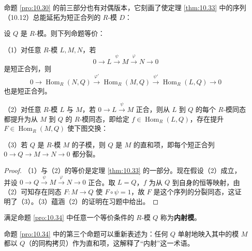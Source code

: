 命题 \ref{pro:10.30} 的前三部分也有对偶版本，它刻画了使定理 \ref{thm:10.33} 中的序列（10.12）总能延拓为短正合列的 \(R\)-模 \(D\)：

\begin{proposition}\label{pro:10.34}
设 \(Q\) 是 \(R\)-模。则下列命题等价：

（1）对任意 \(R\)-模 \(L, M, N\)，若
\[
0 \longrightarrow L \xrightarrow{\ \psi\ } M \xrightarrow{\ \varphi\ } N \longrightarrow 0
\]
是短正合列，则
\[
0 \longrightarrow \operatorname{Hom}_R(N, Q) \xrightarrow{\ \varphi'\ } \operatorname{Hom}_R(M, Q) \xrightarrow{\ \psi'\ } \operatorname{Hom}_R(L, Q) \longrightarrow 0
\]
也是短正合列。

（2）对任意 \(R\)-模 \(L\) 与 \(M\)，若 \(0 \to L \xrightarrow{\psi} M\) 正合，则从 \(L\) 到 \(Q\) 的每个 \(R\)-模同态都提升为从 \(M\) 到 \(Q\) 的 \(R\)-模同态，即给定 \(f \in \operatorname{Hom}_R(L, Q)\)，存在提升 \(F \in \operatorname{Hom}_R(M, Q)\) 使下图交换：
\begin{center}\end{center}

（3）若 \(Q\) 是 \(R\)-模 \(M\) 的子模，则 \(Q\) 是 \(M\) 的直和项，即每个短正合列 \(0 \to Q \to M \to N \to 0\) 都分裂。
\end{proposition}

\begin{proof}
（1）与（2）的等价是定理 \ref{thm:10.33} 的一部分。现在假设（2）成立，并设 \(0 \to Q \xrightarrow{\psi} M \xrightarrow{\varphi} N \to 0\) 正合。取 \(L = Q\)，\(f\) 为从 \(Q\) 到自身的恒等映射，由（2）可知存在同态 \(F : M \to Q\) 使 \(F \circ \psi = 1\)，故 \(F\) 是这个序列的分裂同态，这证明了（3）。（3）蕴涵（2）的证明在习题中给出。
\end{proof}

\begin{definition}
满足命题 \ref{pro:10.34} 中任意一个等价条件的 \(R\)-模 \(Q\) 称为\textbf{内射模}。
\end{definition}

命题 \ref{pro:10.34} 中的第三个命题可以重新表述为：任何 \(Q\) 单射地映入其中的模 \(M\) 都以 \(Q\)（的同构拷贝）作为直和项，这解释了“内射”这一术语。

